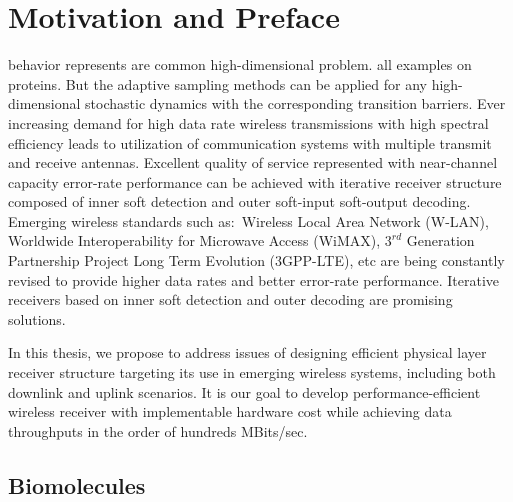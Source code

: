 \chapter{Motivation and Preface}
\label{ch:Intro}
behavior represents are common high-dimensional problem. all examples on proteins. But the adaptive sampling methods can be applied for any high-dimensional stochastic dynamics with the corresponding transition barriers.
Ever increasing demand for high data rate wireless transmissions with high spectral efficiency leads to utilization of communication systems with multiple transmit and receive antennas. Excellent quality of service represented with near-channel capacity error-rate performance can be achieved with iterative receiver structure composed of inner soft detection and outer soft-input soft-output decoding. Emerging wireless standards such as:~Wireless Local Area Network (W-LAN), Worldwide Interoperability for Microwave Access (WiMAX), $3^{rd}$ Generation Partnership Project Long Term Evolution (3GPP-LTE), etc are being constantly revised to provide higher data rates and better error-rate performance. Iterative receivers based on inner soft detection and outer decoding are promising solutions.

In this thesis, we propose to address issues of designing efficient physical layer receiver structure targeting its use in emerging wireless systems, including both downlink and uplink scenarios. It is our goal to develop performance-efficient wireless receiver with implementable hardware cost while achieving data throughputs in the order of hundreds MBits/sec. 


\section{Biomolecules}
\label{sec:MD}


